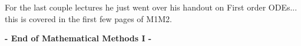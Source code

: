 \documentclass[10pt]{scrartcl}
\begin{document}

For the last couple lectures he just went over his handout on First order ODEs... this is covered in the first few pages of M1M2. 

  \begin{center}
  \textsf{\textbf{- End of Mathematical Methods I -}}	
  \end{center}
  
  
  
\end{document}
